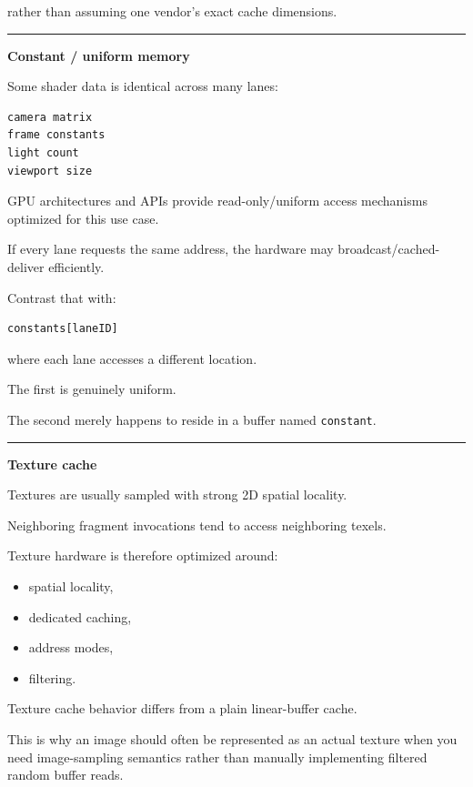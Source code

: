 rather than assuming one vendor's exact cache dimensions.

\begin{center}\rule{0.5\linewidth}{0.5pt}\end{center}

\textbf{Constant / uniform memory}

Some shader data is identical across many lanes:

\protect{}\label{xfh30n}%
\begin{verbatim}
camera matrix
frame constants
light count
viewport size
\end{verbatim}

GPU architectures and APIs provide read-only/uniform access mechanisms optimized for this use case.

If every lane requests the same address, the hardware may broadcast/cached-deliver efficiently.

Contrast that with:

\protect{}\label{7e3tbt}%
\begin{verbatim}
constants[laneID]
\end{verbatim}

where each lane accesses a different location.

The first is genuinely uniform.

The second merely happens to reside in a buffer named \texttt{constant}.

\begin{center}\rule{0.5\linewidth}{0.5pt}\end{center}

\textbf{Texture cache}

Textures are usually sampled with strong 2D spatial locality.

Neighboring fragment invocations tend to access neighboring texels.

Texture hardware is therefore optimized around:

\begin{itemize}
\tightlist
\item
  spatial locality,
\item
  dedicated caching,
\item
  address modes,
\item
  filtering.
\end{itemize}

Texture cache behavior differs from a plain linear-buffer cache.

This is why an image should often be represented as an actual texture when you need image-sampling semantics rather than manually implementing filtered random buffer reads.


